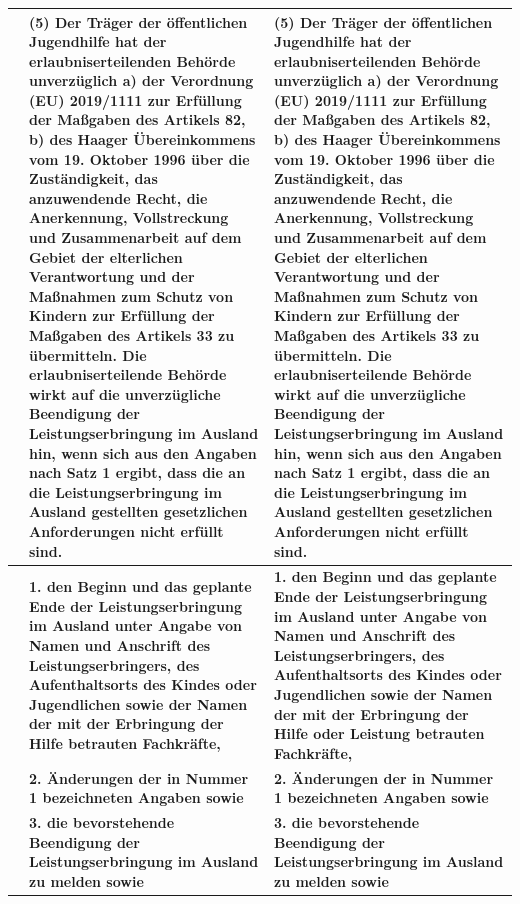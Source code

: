 \documentclass[10pt,a4paper,landscape]{article}
\begin{document}
\begin{longtable}{|L{8.6cm}|L{8.6cm}|L{8.6cm}|}
\hline
 & \textbf{(5) Der Träger der öffentlichen Jugendhilfe hat der erlaubniserteilenden Behörde unverzüglich } \newline \textbf{a) der Verordnung (EU) 2019/1111 zur Erfüllung der Maßgaben des Artikels 82, } \newline \textbf{b) des Haager Übereinkommens vom 19. Oktober 1996 über die Zuständigkeit, das anzuwendende Recht, die Anerkennung, Vollstreckung und Zusammenarbeit auf dem Gebiet der elterlichen Verantwortung und der Maßnahmen zum Schutz von Kindern zur Erfüllung der Maßgaben des Artikels 33 zu übermitteln. Die erlaubniserteilende Behörde wirkt auf die unverzügliche Beendigung der Leistungserbringung im Ausland hin, wenn sich aus den Angaben nach Satz 1 ergibt, dass die an die Leistungserbringung im Ausland gestellten gesetzlichen Anforderungen nicht erfüllt sind. } & \textbf{(5) Der Träger der öffentlichen Jugendhilfe hat der erlaubniserteilenden Behörde unverzüglich } \newline \textbf{a) der Verordnung (EU) 2019/1111 zur Erfüllung der Maßgaben des Artikels 82, } \newline \textbf{b) des Haager Übereinkommens vom 19. Oktober 1996 über die Zuständigkeit, das anzuwendende Recht, die Anerkennung, Vollstreckung und Zusammenarbeit auf dem Gebiet der elterlichen Verantwortung und der Maßnahmen zum Schutz von Kindern zur Erfüllung der Maßgaben des Artikels }\textbf{33 zu übermitteln. Die erlaubniserteilende Behörde wirkt auf die unverzügliche Beendigung der Leistungserbringung im Ausland hin, wenn sich aus den Angaben nach Satz 1 ergibt, dass die an die Leistungserbringung im Ausland gestellten gesetzlichen Anforderungen nicht erfüllt sind. } \\
\hline
 & \textbf{1. den Beginn und das geplante Ende der Leistungserbringung im Ausland unter Angabe von Namen und Anschrift des Leistungserbringers, des Aufenthaltsorts des Kindes oder Jugendlichen sowie der Namen der mit der Erbringung der Hilfe betrauten Fachkräfte, } & \textbf{1. den Beginn und das geplante Ende der Leistungserbringung im Ausland unter Angabe von Namen und Anschrift des Leistungserbringers, des Aufenthaltsorts des Kindes oder Jugendlichen sowie der Namen der mit der Erbringung der Hilfe oder Leistung betrauten Fachkräfte, } \\
\hline
 & \textbf{2. Änderungen der in Nummer 1 bezeichneten Angaben sowie } & \textbf{2. Änderungen der in Nummer 1 bezeichneten Angaben sowie } \\
\hline
 & \textbf{3. die bevorstehende Beendigung der Leistungserbringung im Ausland zu melden sowie } & \textbf{3. die bevorstehende Beendigung der Leistungserbringung im Ausland zu melden sowie } \\

\end{longtable}
\end{document}
